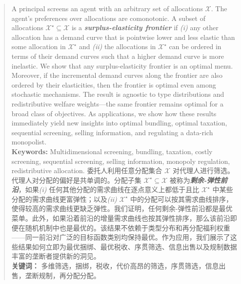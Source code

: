 \documentclass[12pt,letterpaper]{article}
\newenvironment{original}{\color{black}\noindent}{}
\newenvironment{translation}{\color{blue}\noindent}{}
\theoremstyle{plain}
\theoremstyle{definition}
\theoremstyle{remark}
\renewcommand{\1}{\mathds{1}}
\theoremstyle{definition}
\begin{document}
\begin{abstract}
\begin{original}
A principal screens an agent with an arbitrary set of allocations $\mathcal{X}$. The agent's preferences over allocations are comonotonic.
A subset of allocations $\mathcal{X}^\star \subseteq \mathcal{X}$ is a \textit{\textbf{surplus-elasticity frontier}} if \textit{(i)} any other allocation has a demand curve that is pointwise lower and less elastic than some allocation in $\mathcal{X}^\star$ and \textit{(ii)} the allocations in $\mathcal{X}^\star$ can be ordered in terms of their demand curves such that a higher demand curve is more inelastic. We show that any surplus-elasticity frontier is an optimal menu. Moreover, if the incremental demand curves along the frontier are also ordered by their elasticities, then the frontier is optimal even among stochastic mechanisms. The result is agnostic to type distributions and redistributive welfare weights---the same frontier remains optimal for a broad class of objectives. As applications, we show how these results immediately yield new insights into optimal bundling, optimal taxation, sequential screening, selling information, and regulating a data-rich monopolist.
\\
\noindent\textbf{Keywords:} Multidimensional screening,  bundling, taxation, costly screening, sequential screening, selling information, monopoly regulation, redistributive allocation.
\end{original}
\begin{translation}
委托人利用任意分配集合 $\mathcal{X}$ 对代理人进行筛选。代理人对分配的偏好是共单调的。分配子集 $\mathcal{X}^\star \subseteq \mathcal{X}$ 被称为\textit{\textbf{剩余-弹性前沿}}，如果\textit{(i)} 任何其他分配的需求曲线在逐点意义上都低于且比 $\mathcal{X}^\star$ 中某些分配的需求曲线更富弹性；以及\textit{(ii)} $\mathcal{X}^\star$ 中的分配可以按其需求曲线排序，使得较高的需求曲线更缺乏弹性。我们证明，任何剩余-弹性前沿都是最优菜单。此外，如果沿着前沿的增量需求曲线也按其弹性排序，那么该前沿即便在随机机制中也是最优的。该结果不依赖于类型分布和再分配福利权重——同一前沿对广泛的目标函数类别均保持最优。作为应用，我们展示了这些结果如何立即为最优捆绑、最优税收、序贯筛选、信息出售以及规制数据丰富的垄断者提供新的洞见。
\\
\noindent\textbf{关键词：} 多维筛选，捆绑，税收，代价高昂的筛选，序贯筛选，信息出售，垄断规制，再分配分配。
\end{translation}
\end{abstract}
\setcounter{page}{1}
\newpage
\end{document}
